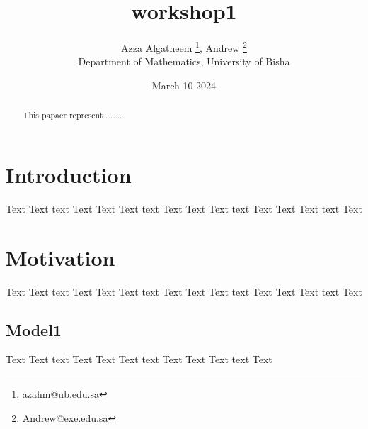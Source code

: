 \documentclass{article}
\title{workshop1}
\author{Azza Algatheem \thanks{azahm@ub.edu.sa}, Andrew \thanks{Andrew@exe.edu.sa}\\
\footnotesize{Department of Mathematics, University of Bisha}}
\date{March 10 2024}
\begin{document}
\maketitle
\begin{abstract}
    This papaer represent ........
\end{abstract}



\newpage
\section{Introduction}
Text Text text Text 
Text Text text Text 
Text Text text Text 
Text Text text Text 
\section{Motivation}
Text Text text Text 
Text Text text Text 
Text Text text Text 
Text Text text Text 
\subsection{Model1}
Text Text text Text 
Text Text text Text 
Text Text text Text



\newpage
\end{document}
